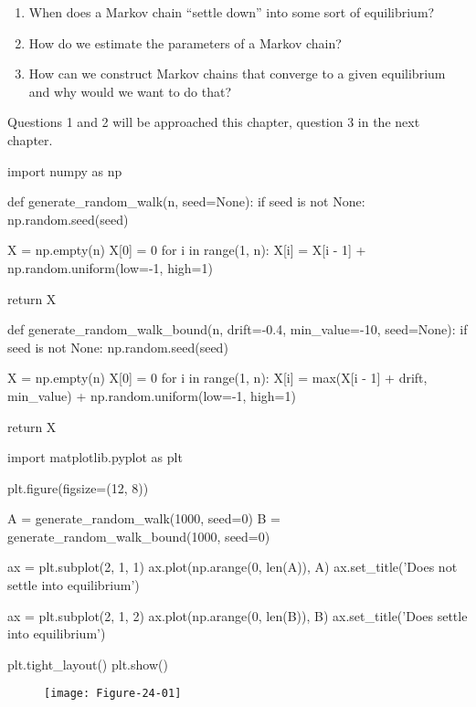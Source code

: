 \begin{enumerate}
\def\labelenumi{\arabic{enumi}.}
\item
  When does a Markov chain ``settle down'' into some sort of
  equilibrium?
\item
  How do we estimate the parameters of a Markov chain?
\item
  How can we construct Markov chains that converge to a given
  equilibrium and why would we want to do that?
\end{enumerate}

Questions 1 and 2 will be approached this chapter, question 3 in the
next chapter.

\begin{python}
import numpy as np

def generate_random_walk(n, seed=None):
    if seed is not None:
        np.random.seed(seed)
    
    X = np.empty(n)
    X[0] = 0
    for i in range(1, n):
        X[i] = X[i - 1] + np.random.uniform(low=-1, high=1)
    
    return X

def generate_random_walk_bound(n, drift=-0.4, min_value=-10, seed=None):
    if seed is not None:
        np.random.seed(seed)
    
    X = np.empty(n)
    X[0] = 0
    for i in range(1, n):
        X[i] = max(X[i - 1] + drift, min_value) + np.random.uniform(low=-1, high=1)
    
    return X
\end{python}

\begin{python}
import matplotlib.pyplot as plt

plt.figure(figsize=(12, 8))

A = generate_random_walk(1000, seed=0)
B = generate_random_walk_bound(1000, seed=0)

ax = plt.subplot(2, 1, 1)
ax.plot(np.arange(0, len(A)), A)
ax.set_title('Does not settle into equilibrium')

ax = plt.subplot(2, 1, 2)
ax.plot(np.arange(0, len(B)), B)
ax.set_title('Does settle into equilibrium')

plt.tight_layout()
plt.show()
\end{python}

\begin{figure}[H]
\texttt{[image: Figure-24-01]}
\end{figure}

